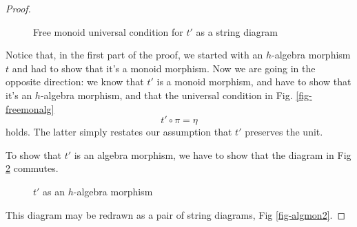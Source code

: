 \documentclass[letterpaper, 10 pt, conference]{ieeeconf}
\begin{document}
\begin{proof}
\begin{figure}[H]
\centering
{}
\caption{Free monoid universal condition for $t'$ as a string diagram}
\label{fig-struni2}
\end{figure}


Notice that, in the first part of the proof, we started with an $h$-algebra morphism $t$ and had to show that it's a monoid morphism. Now we are going in the opposite direction: we know that $t'$ is a monoid morphism, and have to show that it's an $h$-algebra morphism, and that the universal condition in Fig. \ref{fig-freemonalg}
\[t' \circ \pi = \eta\]
holds. The latter simply restates our assumption that $t'$ preserves the unit. 

To show that $t'$ is an algebra morphism, we have to show that the diagram in Fig \ref{fig-halgmor1} commutes.

\begin{figure}[H]
\centering
{}
\caption{$t'$ as an $h$-algebra morphism}
\label{fig-halgmor1}
\end{figure}
This diagram may be redrawn as a pair of string diagrams, Fig \ref{fig-algmon2}.


\end{proof}
\end{document}
